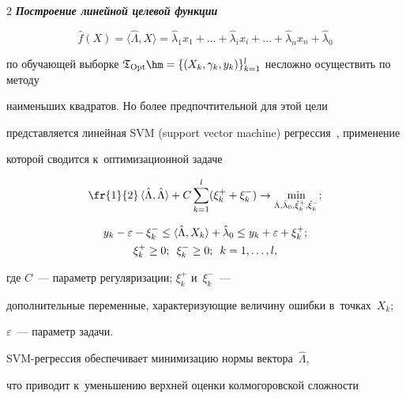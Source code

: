 \begin{multicols}{2}
{\bfseries\textit{Построение линейной целевой функции}} 


$$


\hat{f}(X)=\langle \hat{\Lambda},X \rangle = \hat{\lambda}_1x_1


+\dots + \hat{\lambda}_ix_i+\dots +\hat{\lambda}_nx_n 


+\hat{\lambda}_0


$$ 


по обучающей выборке $\mathfrak{T}_{\mathrm{Opt}}\hm=


\{ (X_k,\gamma_k,y_k)\}_{k=1}^l$  несложно осуществить по методу 


наименьших квад\-ра\-тов. Но более предпочтительной для этой цели 


представляется линейная SVM (support vector machine) ре\-грес\-сия~\cite{12-don}, применение 


которой сводится к~оптимизационной задаче


$$


\fr{1}{2}\,\langle \hat{\Lambda},\hat{\Lambda} \rangle + C \sum_{k=1}^l


(\xi_k^{+}+\xi_k^{-}) \rightarrow 


\underset{\hat{\Lambda},\hat{\lambda}_0,\tilde{\xi}_k^{+},\tilde{\xi}_k^{-}} {\min}; 


$$





\noindent


\begin{gather*}


y_k-\varepsilon -\xi_k^{-} \leq \langle \hat{\Lambda},X_k\rangle + \hat{\lambda}_0 \leq


y_k + \varepsilon + \xi_k^{+}; \\


\xi_k^{+} \geq 0; \enskip \xi_k^{-} \geq 0; \enskip k=1,\dots,l,


\end{gather*}


где $C$~--- параметр регуляризации;  $\xi_k^{+}$ и~$\xi_k^{-}$~--- 


дополнительные переменные, характеризующие величину ошибки в~точках~$X_k$; 


$\varepsilon$~--- параметр задачи.


SVM-ре\-грес\-сия обеспечивает минимизацию нормы вектора~$\hat{\Lambda}$, 


что приводит к~уменьшению верхней оценки колмогоровской сложности~\cite{6-don}  



\end{multicols}
